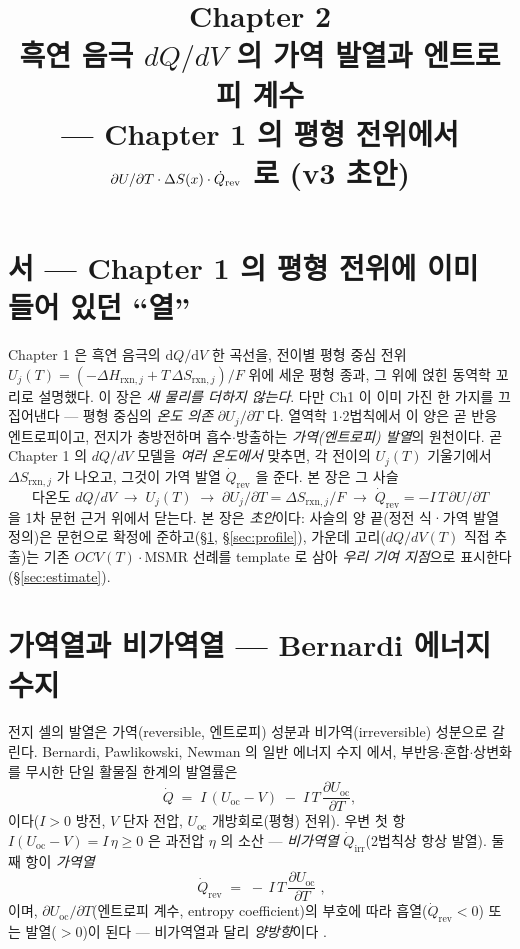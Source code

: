 \documentclass[11pt,a4paper]{article}
\title{\textbf{\LARGE Chapter 2}\\[0.35em]\Large 흑연 음극 $dQ/dV$ 의 가역 발열과 엔트로피 계수\\[0.2em]\large — Chapter 1 의 평형 전위에서 $\partial U/\partial T\cdot\Delta S(x)\cdot\dot Q_\rev$ 로 (v3 초안)}
\author{}\date{}
\newcommand{\dd}{\mathrm{d}}
\newcommand{\rxn}{\mathrm{rxn}}
\newcommand{\rev}{\mathrm{rev}}
\newcommand{\irr}{\mathrm{irr}}
\newcommand{\oc}{\mathrm{oc}}
\begin{document}
\maketitle

\section*{서 — Chapter 1 의 평형 전위에 이미 들어 있던 ``열''}
Chapter 1 은 흑연 음극의 $\dd Q/\dd V$ 한 곡선을, 전이별 평형 중심 전위
$U_j(T)=(-\Delta H_{\rxn,j}+T\,\Delta S_{\rxn,j})/F$ 위에 세운 평형 종과, 그 위에 얹힌 동역학 꼬리로
설명했다. 이 장은 \emph{새 물리를 더하지 않는다}. 다만 Ch1 이 이미 가진 한 가지를 끄집어낸다 —
평형 중심의 \emph{온도 의존} $\partial U_j/\partial T$ 다. 열역학 1$\cdot$2법칙에서 이 양은 곧 반응
엔트로피이고, 전지가 충방전하며 흡수$\cdot$방출하는 \emph{가역(엔트로피) 발열}의 원천이다. 곧 Chapter 1
의 $dQ/dV$ 모델을 \emph{여러 온도에서} 맞추면, 각 전이의 $U_j(T)$ 기울기에서 $\Delta S_{\rxn,j}$ 가
나오고, 그것이 가역 발열 $\dot Q_\rev$ 을 준다. 본 장은 그 사슬
\[
\boxed{\;\text{다온도 } dQ/dV \;\to\; U_j(T)\;\to\;\partial U_j/\partial T=\Delta S_{\rxn,j}/F\;\to\;\dot Q_\rev=-I\,T\,\partial U/\partial T\;}
\]
을 1차 문헌 근거 위에서 닫는다. 본 장은 \emph{초안}이다: 사슬의 양 끝(정전 식·가역 발열 정의)은 문헌으로
확정에 준하고(\S\ref{sec:bernardi}, \S\ref{sec:profile}), 가운데 고리($dQ/dV(T)$ 직접 추출)는 기존
$OCV(T)\cdot$MSMR 선례를 template 로 삼아 \emph{우리 기여 지점}으로 표시한다(\S\ref{sec:estimate}).

\section{가역열과 비가역열 — Bernardi 에너지 수지}\label{sec:bernardi}
전지 셀의 발열은 가역(reversible, 엔트로피) 성분과 비가역(irreversible) 성분으로 갈린다. Bernardi,
Pawlikowski, Newman 의 일반 에너지 수지 \cite{bernardi1985} 에서, 부반응$\cdot$혼합$\cdot$상변화를
무시한 단일 활물질 한계의 발열률은
\begin{equation}
\dot Q \;=\; I\,(U_\oc-V) \;-\; I\,T\,\frac{\partial U_\oc}{\partial T},
\label{eq:bernardi}
\end{equation}
이다($I>0$ 방전, $V$ 단자 전압, $U_\oc$ 개방회로(평형) 전위). 우변 첫 항 $I(U_\oc-V)=I\,\eta\ge0$ 은
과전압 $\eta$ 의 소산 — \emph{비가역열} $\dot Q_\irr$(2법칙상 항상 발열). 둘째 항이 \emph{가역열}
\begin{equation}
\boxed{\;\dot Q_\rev \;=\; -\,I\,T\,\frac{\partial U_\oc}{\partial T}\;,}
\label{eq:qrev}
\end{equation}
이며, $\partial U_\oc/\partial T$(엔트로피 계수, entropy coefficient)의 부호에 따라 흡열($\dot Q_\rev<0$)
또는 발열($>0$)이 된다 — 비가역열과 달리 \emph{양방향}이다 \cite{bernardi1985,standardised2024}.
\end{document}

